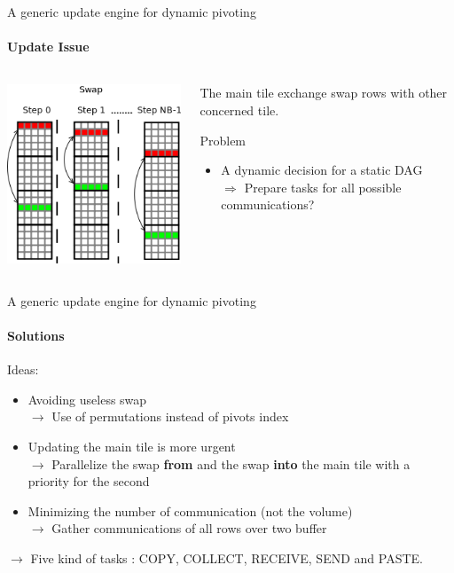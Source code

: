 
\begin{frame}{A generic update engine for dynamic pivoting}
\framesubtitle{Update Issue}
\begin{columns}
\begin{column}{.50\textwidth}
\begin{center}
\includegraphics[scale=0.5]{update_swap.png}
\end{center}
\end{column}
\hfill
\begin{column}{.50\textwidth}
The main tile exchange swap rows with other concerned tile.
\pause
\begin{exampleblock}{Problem}
\begin{itemize}
\item A dynamic decision for a static DAG \\
\pause
$\Longrightarrow$ Prepare tasks for all possible communications?
\end{itemize}
\end{exampleblock}{}
\end{column}
\end{columns}
\end{frame}

\begin{frame}{A generic update engine for dynamic pivoting}
\framesubtitle{Solutions}
Ideas:
\begin{itemize}
\item Avoiding useless swap\\
\pause
$\rightarrow$ Use of permutations instead of pivots index
\pause
\item Updating the main tile is more urgent\\
\pause
$\rightarrow$ Parallelize the swap \textbf{from} and the swap \textbf{into} the main tile with a priority for the second
\pause
\item Minimizing the number of communication (not the volume)\\
\pause
$\rightarrow$ Gather communications of all rows over two buffer
\end{itemize}
\pause
\begin{exampleblock}{}
$\rightarrow$ Five kind of tasks : COPY, COLLECT, RECEIVE, SEND and PASTE.
\end{exampleblock}{}

\end{frame}


